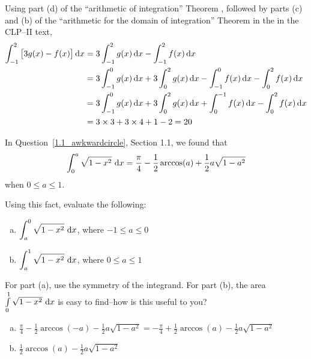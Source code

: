 \begin{solution}
Using part (d) of the ``arithmetic of integration'' Theorem  ,
followed by parts (c) and (b) of the ``arithmetic for the domain of integration'' Theorem
   in the
 in the CLP--II text,
\begin{align*}
\int_{-1}^2 \big[3g(x)-f(x)\big]\,\mathrm{d}x
&=3\int_{-1}^2 g(x)\,\mathrm{d}x-\int_{-1}^2 f(x)\,\mathrm{d}x \\
&=3\int_{-1}^0 g(x)\,\mathrm{d}x+3\int_0^2 g(x)\,\mathrm{d}x
-\int_{-1}^0 f(x)\,\mathrm{d}x-\int_0^2 f(x)\,\mathrm{d}x \\
&=3\int^0_{-1} g(x)\,\mathrm{d}x+3\int_0^2 g(x)\,\mathrm{d}x
+\int_0^{-1} f(x)\,\mathrm{d}x-\int_0^2 f(x)\,\mathrm{d}x \\
&=3\times 3+3\times 4 + 1 - 2 = 20
\end{align*}

\end{solution}
\begin{question} In Question~\ref{1.1_awkwardcircle}, Section 1.1, we found that
\[\int_0^a\sqrt{1-x^2}\ \dee{x}=\frac{\pi}{4} - \frac{1}{2}\arccos(a)+\frac{1}{2}a\sqrt{1-a^2}\]
when $0\le a\le 1$.

Using this fact, evaluate the following:
\begin{enumerate}[(a)]
\item $\displaystyle\int_{a}^0 \sqrt{1-x^2}\ \dee{x}$, where $-1 \leq a \leq 0$
\item $\displaystyle\int_{a}^1 \sqrt{1-x^2}\ \dee{x}$, where $0 \leq a \leq 1$
\end{enumerate}
\end{question}
\begin{hint} For part (a), use the symmetry of the integrand. For part (b), the area $\int	\limits_{0}^1 \sqrt{1-x^2}\ \dee{x}$ is easy to find--how is this useful to you?
\end{hint}
\begin{answer}
\begin{enumerate}[(a)]
\item $\frac{\pi}{4} - \frac{1}{2}\arccos(-a)-\frac{1}{2}a\sqrt{1-a^2}
=-\frac{\pi}{4} + \frac{1}{2}\arccos(a)-\frac{1}{2}a\sqrt{1-a^2}$
\item $\frac{1}{2}\arccos(a)-\frac{1}{2}a\sqrt{1-a^2}$
\end{enumerate}
\end{answer}
